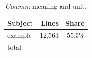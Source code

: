 \begin{table}[t]
  \caption{ \emph{Column}: meaning and unit.}
  \label{tab:example}
  \footnotesize
  \begin{tabular}{lrr}
    \toprule
    Subject & Lines & Share \\
    \midrule
    example & 12{,}563 & 55.5\% \\
    \midrule
    total   & \num{--} & \\
    \bottomrule
  \end{tabular}
\end{table}
